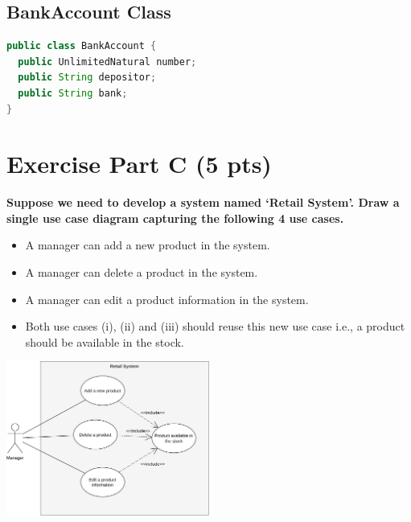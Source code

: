 \documentclass[12pt]{article}
\begin{document}
\subsection*{BankAccount Class}
\begin{lstlisting}[language=Java]
public class BankAccount {
  public UnlimitedNatural number;
  public String depositor;
  public String bank;
}
\end{lstlisting}
\newpage

\section*{Exercise Part C (5 pts)}

\textbf{Suppose we need to develop a system named ‘Retail System’. Draw a single use case diagram capturing the following 4 use cases.}

\begin{itemize}
    \item A manager can add a new product in the system.
    \item A manager can delete a product in the system.
    \item A manager can edit a product information in the system.
    \item Both use cases (i), (ii) and (iii) should reuse this new use case i.e., a product should be available in the stock.
\end{itemize}

\begin{center}
\includegraphics[width=0.5\textwidth]{HW-2-diagrams-Part-C.png}
\end{center}
\end{document}
